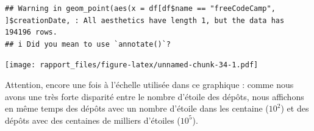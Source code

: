 \documentclass[
]{article}
\newenvironment{Shaded}{\begin{snugshade}}{\end{snugshade}}
\newcommand{\AttributeTok}[1]{\textcolor[rgb]{0.13,0.29,0.53}{#1}}
\newcommand{\CommentTok}[1]{\textcolor[rgb]{0.56,0.35,0.01}{\textit{#1}}}
\newcommand{\DecValTok}[1]{\textcolor[rgb]{0.00,0.00,0.81}{#1}}
\newcommand{\FloatTok}[1]{\textcolor[rgb]{0.00,0.00,0.81}{#1}}
\newcommand{\FunctionTok}[1]{\textcolor[rgb]{0.13,0.29,0.53}{\textbf{#1}}}
\newcommand{\NormalTok}[1]{#1}
\newcommand{\SpecialCharTok}[1]{\textcolor[rgb]{0.81,0.36,0.00}{\textbf{#1}}}
\newcommand{\StringTok}[1]{\textcolor[rgb]{0.31,0.60,0.02}{#1}}
\begin{document}
\begin{Shaded}
\end{Shaded}

\begin{verbatim}
## Warning in geom_point(aes(x = df[df$name == "freeCodeCamp", ]$creationDate, : All aesthetics have length 1, but the data has 194196 rows.
## i Did you mean to use `annotate()`?
\end{verbatim}

\texttt{[image: rapport\_files/figure-latex/unnamed-chunk-34-1.pdf]}

Attention, encore une fois à l'échelle utilisée dans ce graphique :
comme nous avons une très forte disparité entre le nombre d'étoile des
dépôts, nous affichons en même temps des dépôts avec un nombre d'étoile
dans les centaine (\(10^2\)) et des dépôts avec des centaines de
milliers d'étoiles (\(10^5\)).
\end{document}
